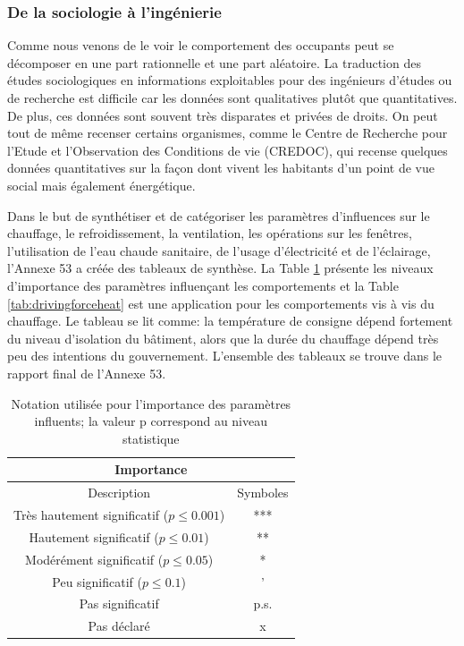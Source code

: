 \subsubsection{De la sociologie à l'ingénierie}

Comme nous venons de le voir le comportement des occupants peut se décomposer en une part rationnelle et une part aléatoire. La traduction des études sociologiques en informations exploitables pour des ingénieurs d'études ou de recherche est difficile car les données sont qualitatives plutôt que quantitatives. De plus, ces données sont souvent très disparates et privées de droits. On peut tout de même recenser certains organismes, comme le Centre de Recherche pour l'Etude et l'Observation des Conditions de vie (CREDOC), qui recense quelques données quantitatives sur la façon dont vivent les habitants d'un point de vue social mais également énergétique. 

Dans le but de synthétiser et de catégoriser les paramètres d'influences sur le chauffage, le refroidissement, la ventilation, les opérations sur les fenêtres, l'utilisation de l'eau chaude sanitaire, de l'usage d'électricité et de l'éclairage, l'Annexe 53 \cite{Annex-53-1} a créée des tableaux de synthèse. La Table \ref{tab:drivingforce} présente les niveaux d'importance des paramètres influençant les comportements et la Table \ref{tab:drivingforceheat} est une application pour les comportements vis à vis du chauffage. Le tableau se lit comme: la température de consigne dépend fortement du niveau d'isolation du bâtiment, alors que la durée du chauffage dépend très peu des intentions du gouvernement. L'ensemble des tableaux se trouve dans le rapport final de l'Annexe 53.

\begin{table}[h]
\begin{center}
\begin{tabular}{|c|c|}
\hline
\multicolumn{2}{|c|}{\textbf{Importance}} \\
\hline
\hline Description & Symboles \\
\hline Très hautement significatif ($p\leq 0.001$) & \cellcolor{OliveGreen} *** \\
\hline Hautement significatif ($p\leq 0.01$) & \cellcolor{LimeGreen} ** \\
\hline Modérément significatif ($p\leq 0.05$) & \cellcolor{yellow} * \\
\hline Peu significatif ($p\leq 0.1$) & \cellcolor{orange} ' \\
\hline Pas significatif & \cellcolor{red} p.s. \\
\hline Pas déclaré & \cellcolor{gray} x \\
\hline
\end{tabular}
\caption{Notation utilisée pour l'importance des paramètres influents; la valeur p correspond au niveau statistique}
\label{tab:drivingforce}
\end{center}
\end{table}

